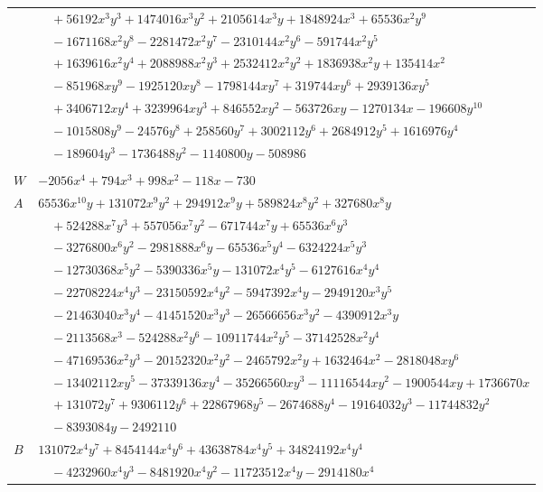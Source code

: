 \documentclass[11pt]{article}
\begin{document}
\begin{longtable}{@{}ll@{}}
 & $\quad +56192x^{3}y^{3}+1474016x^{3}y^{2}+2105614x^{3}y+1848924x^{3}+65536x^{2}y^{9}$\\
 & $\quad -1671168x^{2}y^{8}-2281472x^{2}y^{7}-2310144x^{2}y^{6}-591744x^{2}y^{5}$\\
 & $\quad +1639616x^{2}y^{4}+2088988x^{2}y^{3}+2532412x^{2}y^{2}+1836938x^{2}y+135414x^{2}$\\
 & $\quad -851968xy^{9}-1925120xy^{8}-1798144xy^{7}+319744xy^{6}+2939136xy^{5}$\\
 & $\quad +3406712xy^{4}+3239964xy^{3}+846552xy^{2}-563726xy-1270134x-196608y^{10}$\\
 & $\quad -1015808y^{9}-24576y^{8}+258560y^{7}+3002112y^{6}+2684912y^{5}+1616976y^{4}$\\
 & $\quad -189604y^{3}-1736488y^{2}-1140800y-508986$\\
\addlinespace[3pt]
\multicolumn{2}{@{}l}{$i=7$, $m=64$, neighbours $0,11,17,21,24,25,33,35,39$}\\
$W$ & $-2056x^{4}+794x^{3}+998x^{2}-118x-730$\\
$A$ & $65536x^{10}y+131072x^{9}y^{2}+294912x^{9}y+589824x^{8}y^{2}+327680x^{8}y$\\
 & $\quad +524288x^{7}y^{3}+557056x^{7}y^{2}-671744x^{7}y+65536x^{6}y^{3}$\\
 & $\quad -3276800x^{6}y^{2}-2981888x^{6}y-65536x^{5}y^{4}-6324224x^{5}y^{3}$\\
 & $\quad -12730368x^{5}y^{2}-5390336x^{5}y-131072x^{4}y^{5}-6127616x^{4}y^{4}$\\
 & $\quad -22708224x^{4}y^{3}-23150592x^{4}y^{2}-5947392x^{4}y-2949120x^{3}y^{5}$\\
 & $\quad -21463040x^{3}y^{4}-41451520x^{3}y^{3}-26566656x^{3}y^{2}-4390912x^{3}y$\\
 & $\quad -2113568x^{3}-524288x^{2}y^{6}-10911744x^{2}y^{5}-37142528x^{2}y^{4}$\\
 & $\quad -47169536x^{2}y^{3}-20152320x^{2}y^{2}-2465792x^{2}y+1632464x^{2}-2818048xy^{6}$\\
 & $\quad -13402112xy^{5}-37339136xy^{4}-35266560xy^{3}-11116544xy^{2}-1900544xy+1736670x$\\
 & $\quad +131072y^{7}+9306112y^{6}+22867968y^{5}-2674688y^{4}-19164032y^{3}-11744832y^{2}$\\
 & $\quad -8393084y-2492110$\\
$B$ & $131072x^{4}y^{7}+8454144x^{4}y^{6}+43638784x^{4}y^{5}+34824192x^{4}y^{4}$\\
 & $\quad -4232960x^{4}y^{3}-8481920x^{4}y^{2}-11723512x^{4}y-2914180x^{4}$\\

\end{longtable}
\end{document}
